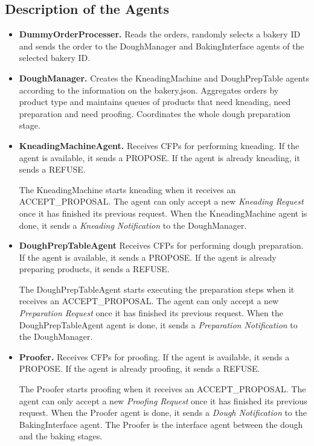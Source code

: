 \documentclass[paper=a4, fontsize=11pt]{scrartcl}
\begin{document}
	\subsection{Description of the Agents}
	
	\begin{itemize}
		\item \textbf{DummyOrderProcesser.} Reads the orders, randomly selects a bakery ID and sends the order to the DoughManager and BakingInterface agents of the selected bakery ID. \\
		
		\item \textbf{DoughManager.} Creates the KneadingMachine and DoughPrepTable agents according to the information on the bakery.json. Aggregates orders by product type and maintains queues of products that need kneading, need preparation and need proofing. Coordinates the whole dough preparation stage.  \\
		
		\item \textbf{KneadingMachineAgent.} Receives CFPs for performing kneading. If the agent is available, it sends a PROPOSE. If the agent is already kneading, it sends a REFUSE. 
		
		The KneadingMachine starts kneading when it receives an ACCEPT\_PROPOSAL. The agent can only accept a new \textit{Kneading Request} once it has finished its previous request. When the KneadingMachine agent is done, it sends a \textit{Kneading Notification} to the DoughManager. \\
		
		\item \textbf{DoughPrepTableAgent} Receives CFPs for performing dough preparation. If the agent is available, it sends a PROPOSE. If the agent is already preparing products, it sends a REFUSE. 
		
		The DoughPrepTableAgent starts executing the preparation steps when it receives an ACCEPT\_PROPOSAL. The agent can only accept a new \textit{Preparation Request} once it has finished its previous request. When the DoughPrepTableAgent agent is done, it sends a \textit{Preparation Notification} to the DoughManager. 
		
		\item \textbf{Proofer.} Receives CFPs for proofing. If the agent is available, it sends a PROPOSE. If the agent is already proofing, it sends a REFUSE. 
		
		The Proofer starts proofing when it receives an ACCEPT\_PROPOSAL. The agent can only accept a new \textit{Proofing Request} once it has finished its previous request. When the Proofer agent is done, it sends a \textit{Dough Notification} to the BakingInterface agent. The Proofer is the interface agent between the dough and the baking stages. \\
		

\end{itemize}
\end{document}
